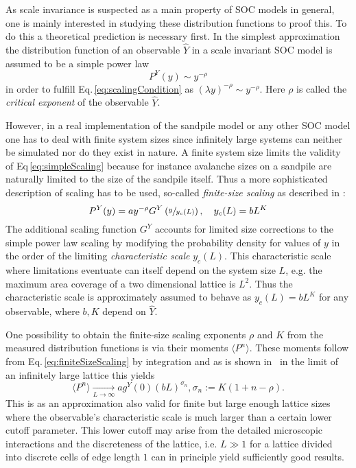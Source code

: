 As scale invariance is suspected as a main property of SOC models in general, one is mainly interested in studying
these distribution functions to proof this. To do this a theoretical prediction is necessary first.
In the simplest approximation the distribution function of an observable $\hat{Y}$ in a scale invariant SOC model
is assumed to be a simple power law
\begin{equation}\label{eq:simpleScaling}
P^{Y}(y) \sim y^{-\rho}
\end{equation}
in order to fulfill Eq.\,\eqref{eq:scalingCondition} as $(\lambda y)^{-\rho}\sim y^{-\rho}$.
Here $\rho$ is called the \emph{critical exponent} of the observable $\hat{Y}$.

However, in a real implementation of the sandpile model or any other SOC model one has to deal with finite system sizes
since infinitely large systems can neither be simulated nor do they exist in nature.
A finite system size limits the validity of Eq\,\eqref{eq:simpleScaling} because for instance avalanche sizes on a
sandpile are naturally limited to the size of the sandpile itself. Thus a more sophisticated description of scaling
has to be used, so-called \emph{finite-size scaling} as described in \cite{SOC-book}:
\begin{equation}\label{eq:finiteSizeScaling}
P^{Y}(y) = a y^{-\rho} G^{Y}\left(\sfrac{y}{y_c(L)}\right), \quad y_c(L)=b L^K
\end{equation}
The additional scaling function $G^{Y}$ accounts for limited size corrections to the simple power law scaling
by modifying the probability density for values of $y$ in the order of the limiting \emph{characteristic scale}
$y_c(L)$. This characteristic scale where limitations eventuate can itself depend on the system size $L$,
e.g. the maximum area coverage of a two dimensional lattice is $L^2$. Thus the characteristic scale is approximately
assumed to behave as $y_c(L)=b L^K$ for any observable, where $b,K$ depend on $\hat{Y}$.

One possibility to obtain the finite-size scaling exponents $\rho$ and $K$ from the measured distribution functions
is via their moments $\langle P^n\rangle$. These moments follow from Eq.\,\eqref{eq:finiteSizeScaling} by integration
and as is shown in~\cite{SOC-book} in the limit of an infinitely large lattice this yields
\begin{equation}\label{eq:momentScaling}
\langle P^n\rangle \xrightarrow[L\to\infty]{} a g^{Y}(0) (bL)^{\sigma_n}, \sigma_n := K(1+n-\rho).
\end{equation}
This is as an approximation also valid for finite but large enough lattice sizes where the observable's
characteristic scale is much larger than a certain lower cutoff parameter. This lower cutoff may arise from the
detailed microscopic interactions and the discreteness of the lattice, i.e. $L \gg 1$ for a lattice divided into
discrete cells of edge length $1$ can in principle yield sufficiently good results.


